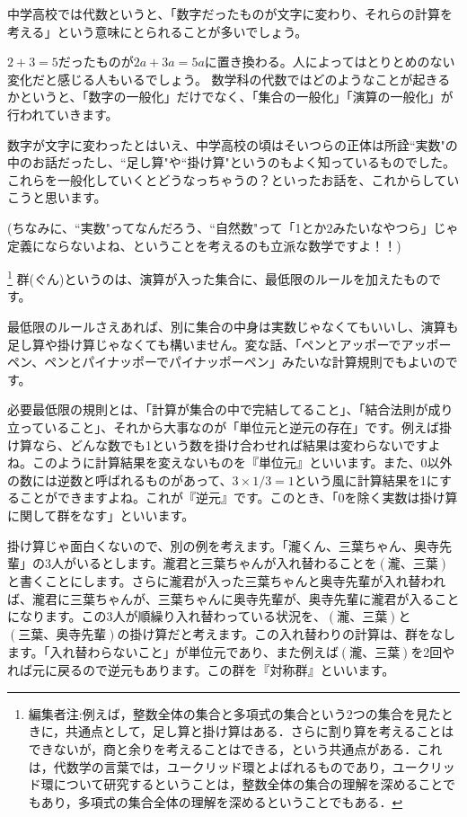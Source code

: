 中学高校では代数というと、「数字だったものが文字に変わり、それらの計算を考える」という意味にとられることが多いでしょう。

$2 + 3 = 5$だったものが$2a + 3a = 5a$に置き換わる。人によってはとりとめのない変化だと感じる人もいるでしょう。
数学科の代数ではどのようなことが起きるかというと、「数字の一般化」だけでなく、「集合の一般化」「演算の一般化」が行われていきます。

数字が文字に変わったとはいえ、中学高校の頃はそいつらの正体は所詮``実数"の中のお話だったし、``足し算"や``掛け算"というのもよく知っているものでした。これらを一般化していくとどうなっちゃうの？といったお話を、これからしていこうと思います。

(ちなみに、``実数"ってなんだろう、``自然数"って「1とか2みたいなやつら」じゃ定義にならないよね、ということを考えるのも立派な数学ですよ！！)

\footnote{編集者注:例えば，整数全体の集合と多項式の集合という2つの集合を見たときに，共通点として，足し算と掛け算はある．さらに割り算を考えることはできないが，商と余りを考えることはできる，という共通点がある．これは，代数学の言葉では，ユークリッド環とよばれるものであり，ユークリッド環について研究するということは，整数全体の集合の理解を深めることでもあり，多項式の集合全体の理解を深めるということでもある．}
群(ぐん)というのは、演算が入った集合に、最低限のルールを加えたものです。

最低限のルールさえあれば、別に集合の中身は実数じゃなくてもいいし、演算も足し算や掛け算じゃなくても構いません。変な話、「ペンとアッポーでアッポーペン、ペンとパイナッポーでパイナッポーペン」みたいな計算規則でもよいのです。

必要最低限の規則とは、「計算が集合の中で完結してること」、「結合法則が成り立っていること」、それから大事なのが「単位元と逆元の存在」です。例えば掛け算なら、どんな数でも1という数を掛け合わせれば結果は変わらないですよね。このように計算結果を変えないものを『単位元』といいます。また、0以外の数には逆数と呼ばれるものがあって、$3 \times 1/3 = 1$という風に計算結果を1にすることができますよね。これが『逆元』です。このとき、「0を除く実数は掛け算に関して群をなす」といいます。

掛け算じゃ面白くないので、別の例を考えます。「瀧くん、三葉ちゃん、奥寺先輩」の3人がいるとします。瀧君と三葉ちゃんが入れ替わることを$(瀧、三葉)$と書くことにします。さらに瀧君が入った三葉ちゃんと奥寺先輩が入れ替われば、瀧君に三葉ちゃんが、三葉ちゃんに奥寺先輩が、奥寺先輩に瀧君が入ることになります。この3人が順繰り入れ替わっている状況を、$(瀧、三葉)$と$(三葉、奥寺先輩)$の掛け算だと考えます。この入れ替わりの計算は、群をなします。「入れ替わらないこと」が単位元であり、また例えば$(瀧、三葉)$を2回やれば元に戻るので逆元もあります。この群を『対称群』といいます。

